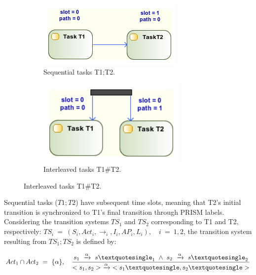 \begin{figure}[ht!]
        \centering
        \begin{subfigure}[b]{0.4\textwidth}
                \includegraphics[width=\textwidth]{imgs/UML_SEQ_TSKS.png}
				\caption{Sequential tasks T1;T2.}
				\label{fig:UML_SEQ_TSKS}
        \end{subfigure}        
        \quad %
        \begin{subfigure}[b]{0.4\textwidth}                
                \includegraphics[width=0.8\textwidth]{imgs/UML_PAR_TSKS.png}
				\caption{Interleaved tasks T1\#T2.}
				\label{fig:UML_PAR_TSKS}
        \end{subfigure}%
          
\end{figure}

Sequential tasks ($T1;T2$) have subsequent time slots, meaning that T2's initial transition is synchronized to T1's final transition through PRISM labels. Considering the transition systems $TS_1$ and $TS_2$ corresponding to T1 and T2, respectively: $TS_i\ =\ (S_i, Act_i, \rightarrow_i, I_i, AP_i, L_i),\quad i\ =\ 1,2$, the transition system resulting from $TS_1;TS_2$ is defined by: 

$$Act_1 \cap Act_2\ =\ \{\alpha\},\quad \frac{s_1\ \xrightarrow{\alpha}\ s\textquotesingle_1\ \wedge\ s_2\ \xrightarrow{\alpha}\ s\textquotesingle_2}{<s_1,s_2>\ \xrightarrow{\alpha}\ <s_1\textquotesingle, s_2\textquotesingle>}$$

